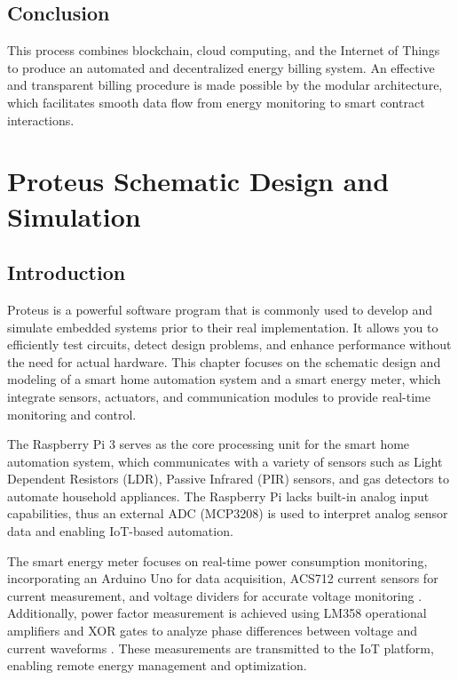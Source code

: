 \documentclass[a4paper,12pt]{report}
\begin{document}
\section{Conclusion}

This process combines blockchain, cloud computing, and the Internet of Things to produce an automated and decentralized energy billing system.  An effective and transparent billing procedure is made possible by the modular architecture, which facilitates smooth data flow from energy monitoring to smart contract interactions.


\chapter{Proteus Schematic Design and Simulation}

\section{Introduction}
Proteus is a powerful software program that is commonly used to develop and simulate embedded systems prior to their real implementation.  It allows you to efficiently test circuits, detect design problems, and enhance performance without the need for actual hardware.  This chapter focuses on the schematic design and modeling of a smart home automation system and a smart energy meter, which integrate sensors, actuators, and communication modules to provide real-time monitoring and control.


The Raspberry Pi 3 serves as the core processing unit for the smart home automation system, which communicates with a variety of sensors such as Light Dependent Resistors (LDR), Passive Infrared (PIR) sensors, and gas detectors to automate household appliances.  The Raspberry Pi lacks built-in analog input capabilities, thus an external ADC (MCP3208) is used to interpret analog sensor data and enabling IoT-based automation\cite{valov2020home}.

The smart energy meter focuses on real-time power consumption monitoring, incorporating an Arduino Uno for data acquisition, ACS712 current sensors for current measurement, and voltage dividers for accurate voltage monitoring \cite{li2010application}. Additionally, power factor measurement is achieved using LM358 operational amplifiers and XOR gates to analyze phase differences between voltage and current waveforms \cite{Khair_2017}. These measurements are transmitted to the IoT platform, enabling remote energy management and optimization.
\end{document}
